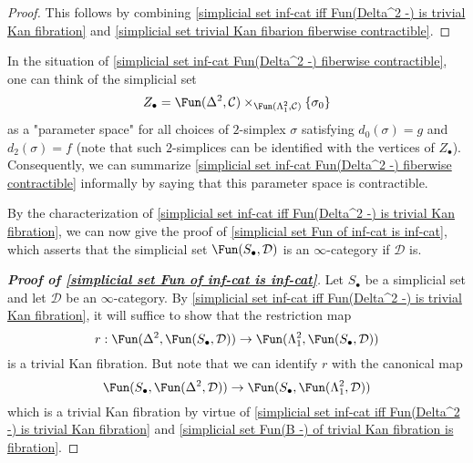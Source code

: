 \begin{proof}
This follows by combining \cref{simplicial set inf-cat iff Fun(Delta^2 -) is trivial Kan fibration} and \cref{simplicial set trivial Kan fibarion fiberwise contractible}.
\end{proof}
\begin{remark}
In the situation of \cref{simplicial set inf-cat Fun(Delta^2 -) fiberwise contractible}, one can think of the simplicial set
\[Z_\bullet=\Fun(\Delta^2,\mathcal{C})\times_{\Fun(\Lambda^2_1,\mathcal{C})}\{\sigma_0\}\]
as a "parameter space" for all choices of $2$-simplex $\sigma$ satisfying $d_0(\sigma)=g$ and $d_2(\sigma)=f$ (note that such $2$-simplices can be identified with the vertices of $Z_\bullet$). Consequently, we can summarize \cref{simplicial set inf-cat Fun(Delta^2 -) fiberwise contractible} informally by saying that this parameter space is contractible.
\end{remark}
By the characterization of \cref{simplicial set inf-cat iff Fun(Delta^2 -) is trivial Kan fibration}, we can now give the proof of \cref{simplicial set Fun of inf-cat is inf-cat}, which asserts that the simplicial set $\Fun(S_\bullet,\mathcal{D})$ is an $\infty$-category if $\mathcal{D}$ is.
\begin{proof}[\textbf{Proof of \cref{simplicial set Fun of inf-cat is inf-cat}}]
Let $S_\bullet$ be a simplicial set and let $\mathcal{D}$ be an $\infty$-category. By \cref{simplicial set inf-cat iff Fun(Delta^2 -) is trivial Kan fibration}, it will suffice to show that the restriction map
\[r:\Fun(\Delta^2,\Fun(S_\bullet,\mathcal{D}))\to\Fun(\Lambda^2_1,\Fun(S_\bullet,\mathcal{D}))\]
is a trivial Kan fibration. But note that we can identify $r$ with the canonical map
\[\Fun(S_\bullet,\Fun(\Delta^2,\mathcal{D}))\to\Fun(S_\bullet,\Fun(\Lambda^2_1,\mathcal{D}))\]
which is a trivial Kan fibration by virtue of \cref{simplicial set inf-cat iff Fun(Delta^2 -) is trivial Kan fibration} and \cref{simplicial set Fun(B -) of trivial Kan fibration is fibration}.
\end{proof}
